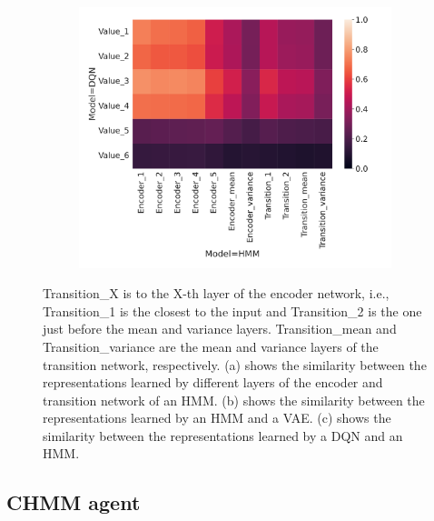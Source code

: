 \documentclass[twoside,11pt]{article}
\begin{document}
\begin{figure}[ht!]
\begin{subfigure}{.3\textwidth}
    \end{subfigure}%
    \begin{subfigure}{.3\textwidth}
        \centering
        \includegraphics[draft=false,width=\linewidth]{cka_figures/CKA_dqn_1_hmm_1}
        \caption{}\label{sfig:cka-hmm-dqn}
    \end{subfigure}
    \caption{Transition\_X is to the X-th layer of the encoder network, i.e., Transition\_1 is the closest to the input and Transition\_2 is the one just before the mean and variance layers. Transition\_mean and Transition\_variance are the mean and variance layers of the transition network, respectively. (a) shows the similarity between the representations learned by different layers of the encoder and transition network of an HMM.
        (b) shows the similarity between the representations learned by an HMM and a VAE.
        (c) shows the similarity between the representations learned by a DQN and an HMM.}
    \label{fig:cka-hmm}
\end{figure}

\subsection{CHMM agent} \label{ssec:chmm_results}
\end{document}
